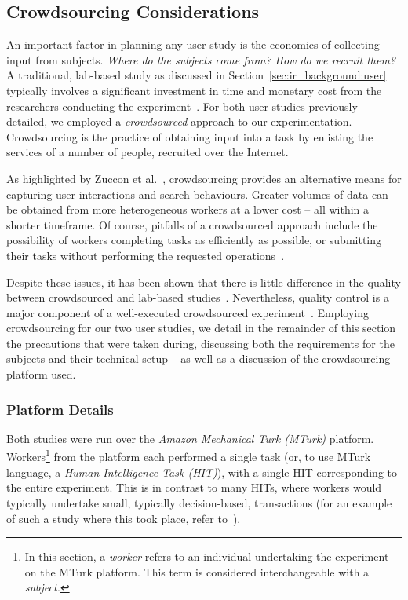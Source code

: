 \subsection{Crowdsourcing Considerations}\label{sec:csm:methodology:user:crowdsourcing}
An important factor in planning any user study is the economics of collecting input from subjects. \emph{Where do the subjects come from? How do we recruit them?} A traditional, lab-based study as discussed in Section~\ref{sec:ir_background:user} typically involves a significant investment in time and monetary cost from the researchers conducting the experiment~\citep{spool2001testing}. For both user studies previously detailed, we employed a \emph{crowdsourced} approach to our experimentation. Crowdsourcing is the practice of obtaining input into a task by enlisting the services of a number of people, recruited over the Internet.

As highlighted by Zuccon et al.~\cite{zuccon2013crowdsourcing_comparisons}, crowdsourcing provides an alternative means for capturing user interactions and search behaviours. Greater volumes of data can be obtained from more heterogeneous workers at a lower cost -- all within a shorter timeframe. Of course, pitfalls of a crowdsourced approach include the possibility of workers completing tasks as efficiently as possible, or submitting their tasks without performing the requested operations~\citep{feild2010turkers}.

Despite these issues, it has been shown that there is little difference in the quality between crowdsourced and lab-based studies~\cite{zuccon2013crowdsourcing_comparisons}. Nevertheless, quality control is a major component of a well-executed crowdsourced experiment~\cite{bota2016information_cards}. Employing crowdsourcing for our two user studies, we detail in the remainder of this section the precautions that were taken during, discussing both the requirements for the subjects and their technical setup -- as well as a discussion of the crowdsourcing platform used.

\subsubsection{Platform Details}
Both studies were run over the \emph{Amazon Mechanical Turk (MTurk)} platform. Workers\footnote{In this section, a \emph{worker} refers to an individual undertaking the experiment on the MTurk platform. This term is considered interchangeable with a \emph{subject.}} from the platform each performed a single task (or, to use MTurk language, a \emph{Human Intelligence Task (HIT)}), with a single HIT corresponding to the entire experiment. This is in contrast to many HITs, where workers would typically undertake small, typically decision-based, transactions (for an example of such a study where this took place, refer to~\cite{bota2016information_cards}).

